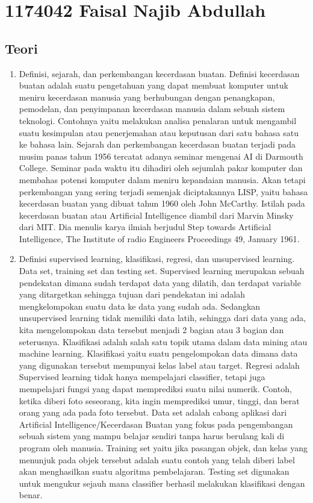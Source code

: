 \section{1174042 Faisal Najib Abdullah}
\subsection{Teori}
\begin{enumerate}
\item Definisi, sejarah, dan perkembangan kecerdasan buatan.
\subitem Definisi kecerdasan buatan adalah suatu pengetahuan yang dapat membuat komputer untuk meniru kecerdasan manusia yang berhubungan dengan penangkapan, pemodelan, dan penyimpanan kecerdasan manusia dalam sebuah sistem teknologi. Contohnya yaitu melakukan analisa penalaran untuk mengambil suatu kesimpulan atau penerjemahan atau keputusan dari satu bahasa satu ke bahasa lain.
\subitem Sejarah dan perkembangan kecerdasan buatan terjadi pada musim panas tahun 1956 tercatat adanya seminar mengenai AI di Darmouth College. Seminar pada waktu itu dihadiri oleh sejumlah pakar komputer dan membahas potensi komputer dalam meniru kepandaian manusia. Akan tetapi perkembangan yang sering terjadi semenjak diciptakannya LISP, yaitu bahasa kecerdasan buatan yang dibuat tahun 1960 oleh John McCarthy. Istilah pada kecerdasan buatan atau Artificial Intelligence diambil dari Marvin Minsky dari MIT. Dia menulis karya ilmiah berjudul Step towards Artificial Intelligence, The Institute of radio Engineers Proceedings 49, January 1961\cite{baraja2008kecerdasan}. 
\item  Definisi supervised learning, klasifikasi, regresi, dan unsupervised learning. Data set, training set dan testing set. 
\subitem Supervised learning merupakan sebuah pendekatan dimana sudah terdapat data yang dilatih, dan terdapat variable yang ditargetkan sehingga tujuan dari pendekatan ini adalah mengkelompokan suatu data ke data yang sudah ada. Sedangkan unsupervised learning tidak memiliki data latih, sehingga dari data yang ada, kita mengelompokan data tersebut menjadi 2 bagian atau 3 bagian dan seterusnya.
\subitem Klasifikasi adalah salah satu topik utama dalam data mining atau machine learning. Klasifikasi yaitu suatu pengelompokan data dimana data yang digunakan tersebut mempunyai kelas label atau target.
\subitem Regresi adalah Supervised learning tidak hanya mempelajari classifier, tetapi juga mempelajari fungsi yang dapat memprediksi suatu nilai numerik. Contoh, ketika diberi foto seseorang, kita ingin memprediksi umur, tinggi, dan berat orang yang ada pada foto tersebut.
\subitem Data set adalah cabang aplikasi dari Artificial Intelligence/Kecerdasan Buatan yang fokus pada pengembangan sebuah sistem yang mampu belajar sendiri tanpa harus berulang kali di program oleh manusia.
\subitem Training set yaitu jika pasangan objek, dan kelas yang menunjuk pada objek tersebut adalah suatu contoh yang telah diberi label akan menghasilkan suatu algoritma pembelajaran.
\subitem Testing set digunakan untuk mengukur sejauh mana classifier berhasil melakukan klasifikasi dengan benar\cite{zhu2009introduction}.
\end{enumerate}

